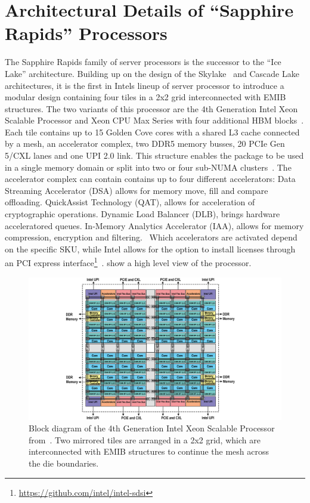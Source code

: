 \chapter{Architectural Details of ``Sapphire Rapids'' Processors}
The Sapphire Rapids family of server processors is the successor to the ``Ice Lake'' architecture.
Building up on the design of the Skylake~\cite{Schoene_2019_SKL} and Cascade Lake~\cite{Velten_2022_Rome_CLX} architectures, it is the first in Intels lineup of server processor to introduce a modular design containing four tiles in a 2x2 grid interconnected with EMIB structures.
The two variants of this processor are the 4th Generation Intel Xeon Scalable Processor and Xeon CPU Max Series with four additional HBM blocks~\cite{Intel_2021_Hotchips}.
Each tile contains up to 15 Golden Cove cores with a shared L3 cache connected by a mesh, an accelerator complex, two DDR5 memory busses, 20 PCIe Gen 5/CXL lanes and one UPI 2.0 link.
This structure enables the package to be used in a single memory domain or split into two or four sub-NUMA clusters~\cite{Intel_4th_gen_scalable}.
The accelerator complex can contain contains up to four different accelerators:
Data Streaming Accelerator (DSA) allows for memory move, fill and compare offloading.
QuickAssist Technology (QAT), allows for acceleration of cryptographic operations.
Dynamic Load Balancer (DLB), brings hardware acceleratored queues.
In-Memory Analytics Accelerator (IAA), allows for memory compression, encryption and filtering.~\cite{Yifan_2024_intel_accelerator_ecosystem,Yuan_2023_ISCA_tutorial,Intel_4th_gen_scalable}
Which accelerators are activated depend on the specific SKU, while Intel allows for the option to install licenses through an PCI express interface\footnote{\url{https://github.com/intel/intel-sdsi}}~\cite{Krenn_2025_Intel_on_demand}.
 show a high level view of the processor.


\begin{figure}[]
    \centering
    \includegraphics[width=\columnwidth]{fig/spr-uma.png}
    \caption{\label{fig:spr-overview}Block diagram of the 4th Generation Intel Xeon Scalable Processor from~\cite{Intel_4th_gen_scalable}.
Two mirrored tiles are arranged in a 2x2 grid, which are interconnected with EMIB structures to continue the mesh across the die boundaries.~\cite{Intel_2022_ISSCC}}
\end{figure}

